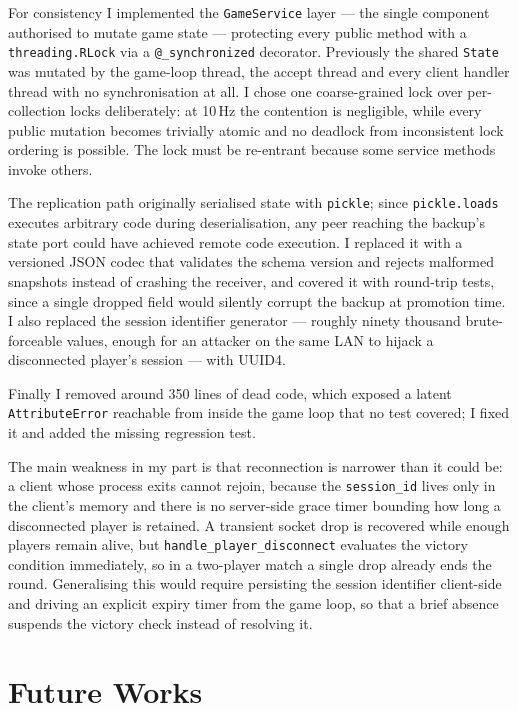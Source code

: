 \documentclass{scrartcl}
\begin{document}
For consistency I implemented the \texttt{GameService} layer --- the single
component authorised to mutate game state --- protecting every public method with
a \texttt{threading.RLock} via a \texttt{@\_synchronized} decorator. Previously
the shared \texttt{State} was mutated by the game-loop thread, the accept thread
and every client handler thread with no synchronisation at all. I chose one
coarse-grained lock over per-collection locks deliberately: at 10\,Hz the
contention is negligible, while every public mutation becomes trivially atomic
and no deadlock from inconsistent lock ordering is possible. The lock must be
re-entrant because some service methods invoke others.

The replication path originally serialised state with \texttt{pickle}; since
\texttt{pickle.loads} executes arbitrary code during deserialisation, any peer
reaching the backup's state port could have achieved remote code execution. I
replaced it with a versioned JSON codec that validates the schema version and
rejects malformed snapshots instead of crashing the receiver, and covered it with
round-trip tests, since a single dropped field would silently corrupt the backup
at promotion time. I also replaced the session identifier generator --- roughly
ninety thousand brute-forceable values, enough for an attacker on the same LAN to
hijack a disconnected player's session --- with UUID4.

Finally I removed around 350 lines of dead code, which exposed a latent
\texttt{AttributeError} reachable from inside the game loop that no test covered;
I fixed it and added the missing regression test.

The main weakness in my part is that reconnection is narrower than it could be: a
client whose process exits cannot rejoin, because the \texttt{session\_id} lives
only in the client's memory and there is no server-side grace timer bounding how
long a disconnected player is retained. A transient socket drop is recovered while
enough players remain alive, but \texttt{handle\_player\_disconnect} evaluates the
victory condition immediately, so in a two-player match a single drop already ends
the round. Generalising this would require persisting the session identifier
client-side and driving an explicit expiry timer from the game loop, so that a
brief absence suspends the victory check instead of resolving it.

\section{Future Works}\label{future-works}
\end{document}
